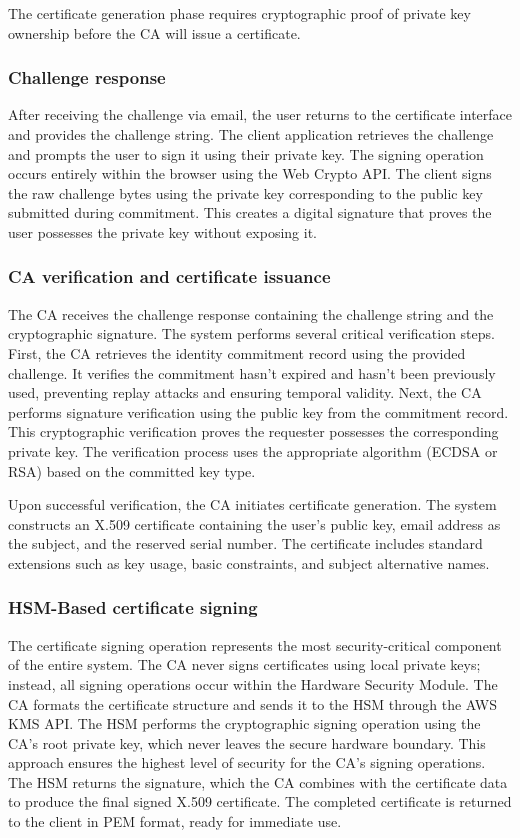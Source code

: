 The certificate generation phase requires cryptographic proof of private key 
ownership before the CA will issue a certificate.

\subsubsection{Challenge response}

After receiving the challenge via email, the user returns to the certificate 
interface and provides the challenge string. The client application retrieves 
the challenge and prompts the user to sign it using their private key.
The signing operation occurs entirely within the browser using the Web Crypto API. 
The client signs the raw challenge bytes using the private key corresponding to 
the public key submitted during commitment. This creates a digital signature 
that proves the user possesses the private key without exposing it.

\subsubsection{CA verification and certificate issuance}

The CA receives the challenge response containing the challenge string and the 
cryptographic signature. The system performs several critical verification steps.
First, the CA retrieves the identity commitment record using the provided challenge. 
It verifies the commitment hasn't expired and hasn't been previously used, 
preventing replay attacks and ensuring temporal validity.
Next, the CA performs signature verification using the public key from the 
commitment record. This cryptographic verification proves the requester possesses 
the corresponding private key. The verification process uses the appropriate 
algorithm (ECDSA or RSA) based on the committed key type.

Upon successful verification, the CA initiates certificate generation. The system 
constructs an X.509 certificate containing the user's public key, email address 
as the subject, and the reserved serial number. The certificate includes standard 
extensions such as key usage, basic constraints, and subject alternative names.

\subsubsection{HSM-Based certificate signing}

The certificate signing operation represents the most security-critical component 
of the entire system. The CA never signs certificates using local private keys; 
instead, all signing operations occur within the Hardware Security Module.
The CA formats the certificate structure and sends it to the HSM through the 
AWS KMS API. The HSM performs the cryptographic signing operation using the 
CA's root private key, which never leaves the secure hardware boundary. This 
approach ensures the highest level of security for the CA's signing operations.
The HSM returns the signature, which the CA combines with the certificate data 
to produce the final signed X.509 certificate. The completed certificate is 
returned to the client in PEM format, ready for immediate use.

